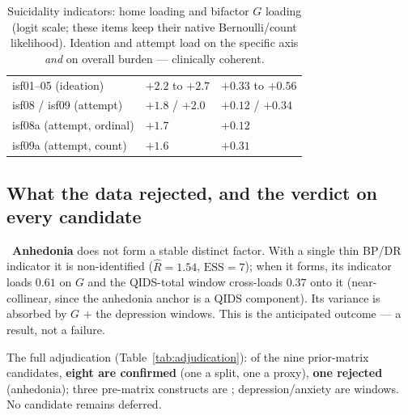 \begin{table}[h]\centering\small\sffamily
\caption{Suicidality indicators: home loading and bifactor $G$ loading (logit scale; these items keep their
native Bernoulli/count likelihood). Ideation and attempt load on the specific axis \emph{and} on overall
burden --- clinically coherent.}
\label{tab:suic}
\begin{tabular}{L{4.8cm} R{3.0cm} R{3.0cm}}
\toprule
{} &  & \\
\midrule
{} isf01--05 (ideation) & $+2.2$ to $+2.7$ & $+0.33$ to $+0.56$\\
isf08 / isf09 (attempt) & $+1.8$ / $+2.0$ & $+0.12$ / $+0.34$\\
 isf08a (attempt, ordinal) & $+1.7$ & $+0.12$\\
isf09a (attempt, count) & $+1.6$ & $+0.31$\\
\bottomrule
\end{tabular}
\end{table}

\subsection{What the data rejected, and the verdict on every candidate}
\rejected\ \textbf{Anhedonia} does not form a stable distinct factor. With a single thin BP/DR indicator it is
non-identified ($\widehat{R}=1.54$, $\mathrm{ESS}=7$); when it forms, its indicator loads $0.61$ on $G$ and the
QIDS-total window cross-loads $0.37$ onto it (near-collinear, since the anhedonia anchor is a QIDS component).
Its variance is absorbed by $G$ + the depression windows. This is the anticipated outcome --- a result, not a
failure.

The full adjudication (Table~\ref{tab:adjudication}): of the nine prior-matrix candidates, \textbf{eight are
confirmed} (one a split, one a proxy), \textbf{one rejected} (anhedonia); three pre-matrix constructs are
; depression/anxiety are windows. No candidate remains deferred.

